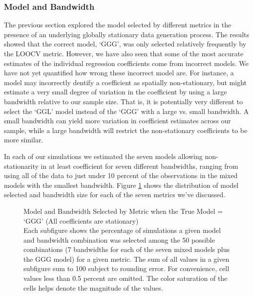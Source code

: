 \documentclass{article}\usepackage[]{graphicx}\usepackage[]{color}
\begin{document}
\subsubsection{Model and Bandwidth}

The previous section explored the model selected by different metrics in the presence of an underlying globally stationary data generation process. The results showed that the correct model, `GGG', was only selected relatively frequently by the LOOCV metric. However, we have also seen that some of the most accurate estimates of the individual regression coefficients come from incorrect models. We have not yet quantified how wrong these incorrect model are. For instance, a model may incorrectly dentify a coefficient as spatially non-stationary, but might estimate a very small degree of variation in the coefficient by using a large bandwidth relative to our sample size. That is, it is potentially very different to select the `GGL' model instead of the `GGG' with a large vs. small bandwidth. A small bandwidth can yield more variation in coefficient estimates across our sample, while a large bandwidth will restrict the non-stationary coefficients to be more similar.

In each of our simulations we estimated the seven models allowing non-stationarity in at least coefficient for seven different bandwidths, ranging from using all of the data to just under 10 percent of the observations in the mixed models with the smallest bandwidth. Figure \ref{fig:GGGmodelBandwidths} shows the distribution of model selected and bandwidth size for each of the seven metrics we've discussed.



\begin{figure}
\caption{Model and Bandwidth Selected by Metric when the True Model = `GGG' (All coefficients are stationary) \\ Each subfigure shows the percentage of simulations a given model and bandwidth combination was selected among the 50 possible combinations (7 bandwidths for each of the seven mixed models plus the GGG model) for a given metric. The sum of all values in a given subfigure sum to 100 subject to rounding error. For convenience, cell values less than 0.5 percent are omitted. The color saturation of the cells helps denote the magnitude of the values.}
\label{fig:GGGmodelBandwidths}
\end{figure}
\end{document}
